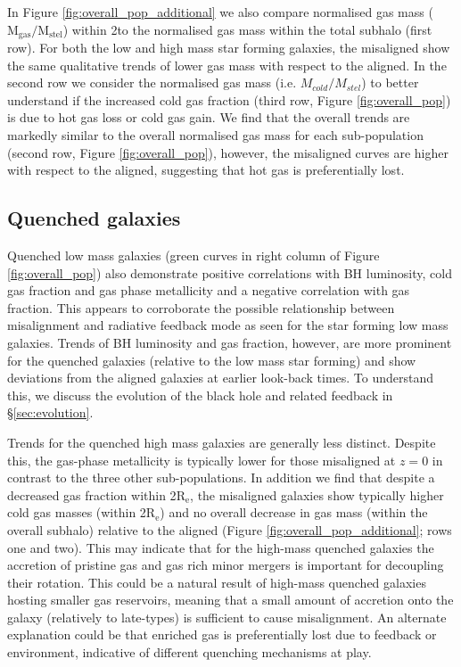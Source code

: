 In Figure \ref{fig:overall_pop_additional} we also compare normalised gas mass ($\mathrm{M_{gas} / M_{stel}}$) within 2\re to the normalised gas mass within the total subhalo (first row). For both the low and high mass star forming galaxies, the misaligned show the same qualitative trends of lower gas mass with respect to the aligned.  In the second row we consider the normalised gas mass (i.e. $M_{cold} / M_{stel}$) to better understand if the increased cold gas fraction (third row, Figure \ref{fig:overall_pop}) is due to hot gas loss or cold gas gain. We find that the overall trends are markedly similar to the overall normalised gas mass for each sub-population (second row, Figure \ref{fig:overall_pop}), however, the misaligned curves are higher with respect to the aligned, suggesting that hot gas is preferentially lost. 

\subsection{Quenched galaxies}
Quenched low mass galaxies (green curves in right column of Figure \ref{fig:overall_pop}) also demonstrate positive correlations with BH luminosity, cold gas fraction and gas phase metallicity and a negative correlation with gas fraction. This appears to corroborate the possible relationship between misalignment and radiative feedback mode as seen for the star forming low mass galaxies. Trends of BH luminosity and gas fraction, however, are more prominent for the quenched galaxies (relative to the low mass star forming) and show deviations from the aligned galaxies at earlier look-back times. To understand this, we discuss the evolution of the black hole and related feedback in \S\ref{sec:evolution}.
 
Trends for the quenched high mass galaxies are generally less distinct. Despite this, the gas-phase metallicity is typically lower for those misaligned at $z=0$ in contrast to the three other sub-populations. In addition we find that despite a decreased gas fraction within 2$\mathrm{R_{e}}$, the misaligned galaxies show typically higher cold gas masses (within 2$\mathrm{R_{e}}$) and no overall decrease in gas mass (within the overall subhalo) relative to the aligned (Figure \ref{fig:overall_pop_additional}; rows one and two). This may indicate that for the high-mass quenched galaxies the accretion of pristine gas and gas rich minor mergers is important for decoupling their rotation. This could be a natural result of high-mass quenched galaxies hosting smaller gas reservoirs, meaning that a small amount of accretion onto the galaxy (relatively to late-types) is sufficient to cause misalignment. An alternate explanation could be that enriched gas is preferentially lost due to feedback or environment, indicative of different quenching mechanisms at play.

